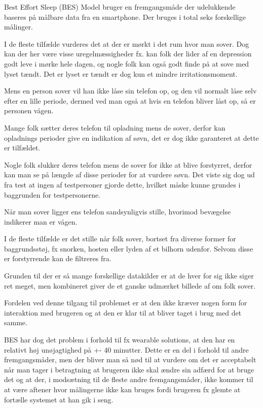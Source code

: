 Best Effort Sleep (BES) Model bruger en fremgangsmåde der udelukkende baseres på målbare data fra en smartphone. Der bruges i total seks forskellige målinger.
\begin{description}[style=nextline]
\item[Lys]
I de fleste tilfælde vurderes det at der er mørkt i det rum hvor man sover. Dog kan der her være visse uregelmæssigheder fx. kan folk der lider af en depression godt leve i mørke hele dagen, og nogle folk kan også godt finde på at sove med lyset tændt. Det er lyset er tændt er dog kun et mindre irritationsmoment.
\item[Varighed af telefonens låste perioder]
Mens en person sover vil han ikke låse sin telefon op, og den vil normalt låse selv efter en lille periode, dermed ved man også at hvis en telefon bliver låst op, så er personen vågen.
\item[Telefonens opladnings perioder]
Mange folk sætter deres telefon til opladning mens de sover, derfor kan opladnings perioder give en indikation af søvn, det er dog ikke garanteret at dette er tilfældet.
\item[Telefon slukket]
Nogle folk slukker deres telefon mens de sover for ikke at blive forstyrret, derfor kan man se på længde af disse perioder for at vurdere søvn. Det viste sig dog ud fra test at ingen af testpersoner gjorde dette, hvilket måske kunne grundes i baggrunden for testpersonerne. 
\item[Bevægelse]
Når man sover ligger ens telefon sandsynligvis stille, hvorimod bevægelse indikerer man er vågen.
\item[Lyd]
I de fleste tilfælde er det stille når folk sover, bortset fra diverse former for baggrundsstøj, fx snorken, hosten eller  lyden af et bilhorn udenfor. Selvom disse er forstyrrende kan de filtreres fra.
\end{description}

Grunden til der er så mange forskellige datakilder er at de hver for sig ikke siger ret meget, men kombineret giver de et ganske udmærket billede af om folk sover.

Fordelen ved denne tilgang til problemet er at den ikke kræver nogen form for interaktion med brugeren og at den er klar til at bliver taget i brug med det samme.

BES har dog det problem i forhold til fx wearable solutions, at den har en relativt høj unøjagtighed på +- 40 minutter. 
Dette er en del i forhold til andre fremgangsmåder, men der bliver man så nød til at vurdere om det er acceptabelt når man tager i betragtning at brugeren ikke skal ændre sin adfærd for at bruge det og at der, i modsætning til de fleste andre fremgangsmåder, ikke kommer til at være aftener hvor målingerne ikke kan bruges fordi brugeren fx glemte at fortælle systemet at han gik i seng.
 

